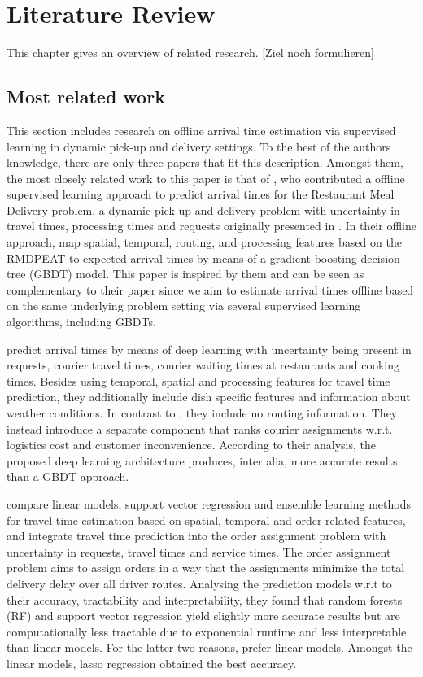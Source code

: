 \chapter{Literature Review}
\label{chap:review}
This chapter gives an overview of related research. [Ziel noch formulieren]


\section{Most related work}
This section includes research on offline arrival time estimation via supervised learning in dynamic pick-up and delivery settings.
To the best of the authors knowledge, there are only three papers that fit this description. Amongst them, the most closely related work to this paper is that of \citet{Hildebrandt2020_EAT}, who contributed a offline supervised learning approach to predict arrival times for the Restaurant Meal Delivery problem, a dynamic pick up and delivery problem with uncertainty in travel times, processing times and requests originally presented in \citet{UlmerRMDP}.
In their offline approach, \citet{Hildebrandt2020_EAT} map spatial, temporal, routing, and processing features based on the RMDPEAT to expected arrival times by means of a gradient boosting decision tree (GBDT) model. This paper is inspired by them and can be seen as complementary to their paper since we aim to estimate arrival times offline based on the same underlying problem setting via several supervised learning algorithms, including GBDTs.

\citet{Zhu2020_OFCTE_DL} predict arrival times by means of deep learning with uncertainty being present in requests, courier travel times, courier waiting times at restaurants and cooking times. Besides using temporal, spatial and processing features for travel time prediction, they additionally include dish specific features and information about weather conditions. In contrast to \citet{Hildebrandt2020_EAT}, they include no routing information. They instead introduce a separate component that ranks courier assignments w.r.t. logistics cost and customer inconvenience. According to their analysis, the proposed deep learning architecture produces, inter alia, more accurate results than a GBDT approach.

\citet{Liu2018_LM_PLM} compare linear models, support vector regression and ensemble learning methods for travel time estimation based on spatial, temporal and order-related features, and integrate travel time prediction into the order assignment problem with uncertainty in requests, travel times and service times. The order assignment problem aims to assign orders in a way that the assignments minimize the total delivery delay over all driver routes. Analysing the prediction models w.r.t to their accuracy, tractability and interpretability, they found that random forests (RF) and support vector regression yield slightly more accurate results but are computationally less tractable due to exponential runtime and less interpretable than linear models. For the latter two reasons, \citet{Liu2018_LM_PLM} prefer linear models. Amongst the linear models, lasso regression obtained the best accuracy.


